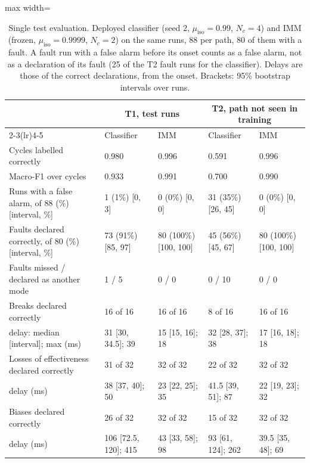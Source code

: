\documentclass[10pt]{article}
\begin{document}
\begin{table}[h]
\centering\small
\caption{Single test evaluation. Deployed classifier (seed 2, $\mu_{\mathrm{iso}}=0.99$, $N_c=4$) and IMM (frozen, $\mu_{\mathrm{iso}}=0.9999$, $N_c=2$) on the same runs, 88 per path, 80 of them with a fault. A fault run with a false alarm before its onset counts as a false alarm, not as a declaration of its fault (25 of the T2 fault runs for the classifier). Delays are those of the correct declarations, from the onset. Brackets: 95\% bootstrap intervals over runs.}\label{tab:test}
\begin{adjustbox}{max width=\linewidth}\begin{tabular}{@{}lllll@{}}
\toprule
 & \multicolumn{2}{c}{T1, test runs} & \multicolumn{2}{c}{T2, path not seen in training} \\
\cmidrule(lr){2-3}\cmidrule(lr){4-5}
 & Classifier & IMM & Classifier & IMM \\
\midrule
Cycles labelled correctly & 0.980 & 0.996 & 0.591 & 0.996 \\
Macro-F1 over cycles & 0.933 & 0.991 & 0.700 & 0.990 \\
Runs with a false alarm, of 88 (\%) [interval, \%] & 1 (1\%) [0, 3] & 0 (0\%) [0, 0] & 31 (35\%) [26, 45] & 0 (0\%) [0, 0] \\
Faults declared correctly, of 80 (\%) [interval, \%] & 73 (91\%) [85, 97] & 80 (100\%) [100, 100] & 45 (56\%) [45, 67] & 80 (100\%) [100, 100] \\
Faults missed / declared as another mode & 1 / 5 & 0 / 0 & 0 / 10 & 0 / 0 \\
Breaks declared correctly & 16 of 16 & 16 of 16 & 8 of 16 & 16 of 16 \\
\quad delay: median [interval]; max (ms) & 31 [30, 34.5]; 39 & 15 [15, 16]; 18 & 32 [28, 37]; 38 & 17 [16, 18]; 18 \\
Losses of effectiveness declared correctly & 31 of 32 & 32 of 32 & 22 of 32 & 32 of 32 \\
\quad delay (ms) & 38 [37, 40]; 50 & 23 [22, 25]; 35 & 41.5 [39, 51]; 87 & 22 [19, 23]; 32 \\
Biases declared correctly & 26 of 32 & 32 of 32 & 15 of 32 & 32 of 32 \\
\quad delay (ms) & 106 [72.5, 120]; 415 & 43 [33, 58]; 98 & 93 [61, 124]; 262 & 39.5 [35, 48]; 69 \\
\bottomrule
\end{tabular}\end{adjustbox}
\end{table}
\end{document}
